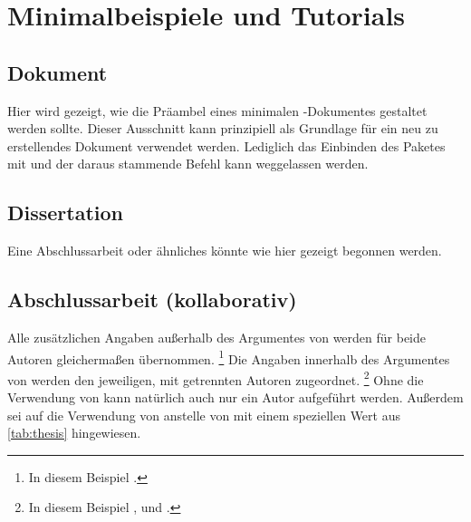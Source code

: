 \chapter{Minimalbeispiele und Tutorials}
\label{sec:exmpl}
\section{Dokument}
Hier wird gezeigt, wie die Präambel eines minimalen -Dokumentes 
gestaltet werden sollte. Dieser Ausschnitt kann prinzipiell als Grundlage für 
ein neu zu erstellendes Dokument verwendet werden. Lediglich das Einbinden des 
Paketes  mit  und 
der daraus stammende Befehl  kann weggelassen werden.
\section{Dissertation}
\label{sec:exmpl:dissertation}
Eine Abschlussarbeit oder ähnliches könnte wie hier gezeigt begonnen werden.
\section{Abschlussarbeit (kollaborativ)}
\label{sec:exmpl:thesis}
Alle zusätzlichen Angaben außerhalb des Argumentes von  werden 
für beide Autoren gleichermaßen übernommen.%
\footnote{In diesem Beispiel .}
Die Angaben innerhalb des Argumentes von  werden den jeweiligen, 
mit  getrennten Autoren zugeordnet.%
\footnote{%
  In diesem Beispiel ,  und 
  .
}
Ohne die Verwendung von  kann natürlich auch nur ein Autor 
aufgeführt werden. Außerdem sei auf die Verwendung von  anstelle 
von  mit einem speziellen Wert aus \autoref{tab:thesis} 
hingewiesen.
